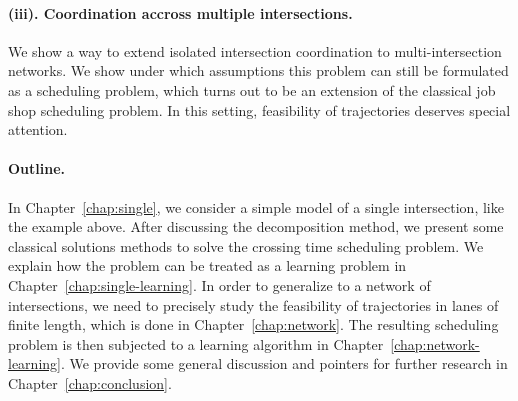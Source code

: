 \documentclass[a4paper]{report}
\theoremstyle{definition}
\theoremstyle{plain}
\begin{document}
\paragraph{(iii). Coordination accross multiple intersections.}
We show a way to extend isolated intersection coordination to multi-intersection
networks. We show under which assumptions this problem can still be formulated
as a scheduling problem, which turns out to be an extension of the classical job
shop scheduling problem.
%
In this setting, feasibility of trajectories deserves special attention.

\paragraph{Outline.}

In Chapter~\ref{chap:single}, we consider a simple model of a single
intersection, like the example above. After discussing the decomposition method,
we present some classical solutions methods to solve the crossing time
scheduling problem.
%
We explain how the problem can be treated as a learning problem in
Chapter~\ref{chap:single-learning}.
%
In order to generalize to a network of intersections, we need to precisely study
the feasibility of trajectories in lanes of finite length, which is done in
Chapter~\ref{chap:network}.
%
The resulting scheduling problem is then subjected to a learning algorithm in
Chapter~\ref{chap:network-learning}.
%
We provide some general discussion and pointers for further research in
Chapter~\ref{chap:conclusion}.




\end{document}
